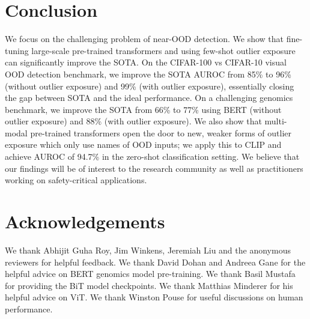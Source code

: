 \documentclass{article}
\begin{document}
\section{Conclusion}
We focus on the challenging problem of near-OOD detection. We show that fine-tuning large-scale pre-trained transformers and using few-shot outlier exposure can significantly improve the SOTA. On the CIFAR-100 vs CIFAR-10 visual OOD detection  benchmark, we improve the SOTA AUROC from 85\% to 96\% (without outlier exposure) and 99\% (with outlier exposure), essentially closing the gap between SOTA and the ideal performance. 
On a challenging genomics benchmark, we improve the  SOTA from 66\% to 77\% using BERT (without outlier exposure) and 88\% (with outlier exposure). We also show that multi-modal pre-trained transformers open the door to new, weaker forms of outlier exposure which only use names of OOD inputs; we apply this to CLIP and achieve AUROC of 94.7\% in the zero-shot classification setting. 
We believe that our findings will be of interest to the research community as well as practitioners working on safety-critical applications. 




\section*{Acknowledgements}
 We thank Abhijit Guha Roy, Jim Winkens, Jeremiah Liu and the anonymous reviewers for helpful feedback. We thank David Dohan and Andreea Gane for the helpful advice on BERT genomics model pre-training. We thank Basil Mustafa for providing the BiT model checkpoints. We thank Matthias Minderer for his helpful advice on ViT. We thank Winston Pouse for useful discussions on human performance.























\clearpage
\newpage
\appendix
\end{document}
